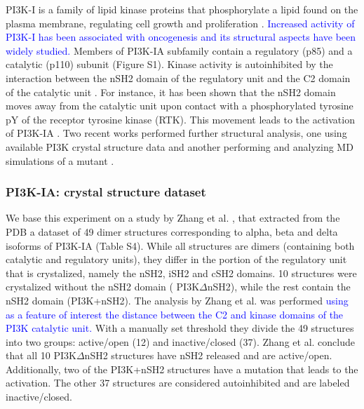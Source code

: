 \documentclass[unnumsec,webpdf,contemporary,large,numsquare]{oup-authoring-template}%
\theoremstyle{thmstyleone}%
\theoremstyle{thmstyletwo}%
\theoremstyle{thmstylethree}%
\begin{document}
PI3K-I is a family of lipid kinase proteins that phosphorylate a lipid found on the plasma membrane, regulating cell growth and proliferation \citep{martini_pi3kakt_2014}. \textcolor{blue}{Increased activity of PI3K-I has been associated with oncogenesis and its structural aspects have been widely studied.} Members of PI3K-IA subfamily contain a regulatory (p85) and a catalytic (p110) subunit (Figure S1). Kinase activity is autoinhibited by the interaction between the nSH2 domain of the regulatory unit and the C2 domain of the catalytic unit \citep{yu_regulation_1998, miller_structural_2014}. For instance, it has been shown that the nSH2 domain moves away from the catalytic unit upon contact with a phosphorylated tyrosine pY of the receptor tyrosine kinase (RTK). This movement leads to the activation of PI3K-IA \citep{buckles_single-molecule_2017, nolte_crystal_1996, vadas_structural_2011}. Two recent works performed further structural analysis, one using available PI3K crystal structure data \citep{zhang_structural_2020}  and another performing and analyzing MD simulations of a mutant \citep{galdadas_unravelling_2020}. 


\subsubsection{PI3K-IA: crystal structure dataset}

We base this experiment on a study by Zhang et al. \citep{zhang_structural_2020}, that extracted from the PDB a dataset of 49 dimer structures corresponding to alpha, beta and delta isoforms of PI3K-IA (Table S4). While all structures are dimers (containing both catalytic and regulatory units), they differ in the portion of the regulatory unit that is crystalized, namely the nSH2, iSH2 and cSH2 domains. 10 structures were crystalized without the nSH2 domain ( PI3K$\Delta$nSH2), while the rest contain the nSH2 domain (PI3K+nSH2). The analysis by Zhang et al. was performed \textcolor{blue}{using as a feature of interest the distance between the C2 and kinase domains of the PI3K catalytic unit.} With a manually set threshold they divide the 49 structures into two groups: active/open (12) and inactive/closed (37). Zhang et al. conclude that all 10 PI3K$\Delta$nSH2 structures have nSH2 released and are active/open. Additionally, two of the PI3K+nSH2 structures have a mutation that leads to the activation. The other 37 structures are considered autoinhibited and are labeled inactive/closed.
\end{document}
